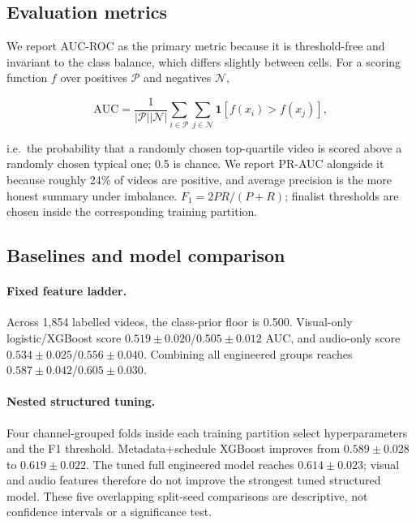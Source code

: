 \documentclass[letterpaper]{article}
\begin{document}

\subsection{Evaluation metrics}

We report AUC-ROC as the primary metric because it is threshold-free and
invariant to the class balance, which differs slightly between cells. For a
scoring function $f$ over positives $\mathcal{P}$ and negatives $\mathcal{N}$,

\begin{equation}
\mathrm{AUC} = \frac{1}{|\mathcal{P}||\mathcal{N}|}
\sum_{i \in \mathcal{P}} \sum_{j \in \mathcal{N}}
\mathbf{1}\!\left[f(x_i) > f(x_j)\right],
\end{equation}

\noindent i.e.\ the probability that a randomly chosen top-quartile video is scored
above a randomly chosen typical one; 0.5 is chance. We report PR-AUC alongside
it because roughly 24\% of videos are positive, and average precision is the
more honest summary under imbalance. $F_1 = 2PR/(P+R)$; finalist thresholds are
chosen inside the corresponding training partition.

\subsection{Baselines and model comparison}

\paragraph{Fixed feature ladder.} Across 1,854 labelled videos, the class-prior floor is 0.500. Visual-only logistic/XGBoost score $0.519\pm0.020$/$0.505\pm0.012$ AUC, and audio-only score $0.534\pm0.025$/$0.556\pm0.040$. Combining all engineered groups reaches $0.587\pm0.042$/$0.605\pm0.030$.

\paragraph{Nested structured tuning.} Four channel-grouped folds inside each training partition select hyperparameters and the F1 threshold. Metadata+schedule XGBoost improves from $0.589\pm0.028$ to $0.619\pm0.022$. The tuned full engineered model reaches $0.614\pm0.023$; visual and audio features therefore do not improve the strongest tuned structured model. These five overlapping split-seed comparisons are descriptive, not confidence intervals or a significance test.
\end{document}
